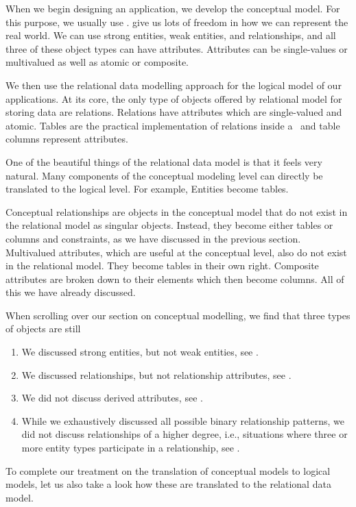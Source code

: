 %
%
When we begin designing an application, we develop the conceptual model.
For this purpose, we usually use .
 give us lots of freedom in how we can represent the real world.
We can use strong entities, weak entities, and relationships, and all three of these object types can have attributes.
Attributes can be single-values or multivalued as well as atomic or composite.

We then use the relational data modelling approach for the logical model of our applications.
At its core, the only type of objects offered by relational model for storing data are relations.
Relations have attributes which are single-valued and atomic.
Tables are the practical implementation of relations inside a \dbms\ and table columns represent attributes.

One of the beautiful things of the relational data model is that it feels very natural.
Many components of the conceptual modeling level can directly be translated to the logical level.
For example, Entities become tables.

Conceptual relationships are objects in the conceptual model that do not exist in the relational model as singular objects.
Instead, they become either tables or columns and constraints, as we have discussed in the previous section.
Multivalued attributes, which are useful at the conceptual level, also do not exist in the relational model.
They become tables in their own right.
Composite attributes are broken down to their elements which then become columns.
All of this we have already discussed.

When scrolling over our section on conceptual modelling, we find that three types of objects are still %
%
\begin{enumerate}%
%
\item We discussed strong entities, but not weak entities, see .%
%
\item We discussed relationships, but not relationship attributes, see .%
%
\item We did not discuss derived attributes, see .%
%
\item While we exhaustively discussed all possible binary relationship patterns, we did not discuss relationships of a higher degree, i.e., situations where three or more entity types participate in a relationship, see .%
%
\end{enumerate}%
%
To complete our treatment on the translation of conceptual models to logical models, let us also take a look how these are translated to the relational data model.%
%
\FloatBarrier%
%
%
%
%
%
%
\endhsection%
%
